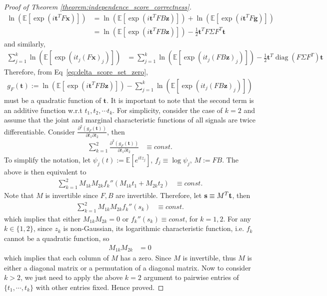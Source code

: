 \documentclass[letterpaper]{article}
\newcommand{\bas}[1]{\begin{align*}#1\end{align*}}
\newcommand{\bx}{\pmb{x}}
\newcommand{\bt}{\pmb{t}}
\newcommand{\bg}{\pmb{g}}
\newcommand{\bz}{\pmb{z}}
\newcommand{\E}{\mathbb{E}}
\newcommand{\bb}[1]{\left(#1\right)}
\newcommand{\bbb}[1]{\left[#1\right]}
\DeclareMathOperator{\diag}{diag}
\begin{document}
\begin{proof}[Proof of Theorem \ref{theorem:independence_score_correctness}]
\bas{
    \ln\bb{\E\bbb{\exp(i\bt^TF\bx)}} &= \ln\bb{\E\bbb{\exp(i\bt^TFB\bz)}} + \ln\bb{\E\bbb{\exp(i\bt^TF\bg)}} \\ 
    &= \ln\bb{\E\bbb{\exp(i\bt^TFB\bz)}} - \frac{1}{2}\bt^T F\Sigma F^T\bt
}
and similarly,
\bas{
    \sum_{j=1}^{k}\ln\bb{\E\bbb{\exp(i t_j (F\bx)_j)}} &= \sum_{j=1}^{k}\ln\bb{\E\bbb{\exp(i t_j (FB\bz)_j)}} - \frac{1}{2}\bt^T\diag\bb{F \Sigma F^T}\bt
}
Therefore, from Eq~\ref{eq:delta_score_set_zero}, 
\bas{
    g_{F}\bb{\bt} := \ln\bb{\E\bbb{\exp(i\bt^TFB\bz)}} - \sum_{j=1}^{k}\ln\bb{\E\bbb{\exp(i t_j (FB\bz)_j)}}
}
must be a quadratic function of $\bt$. 
It is important to note that the second term is an additive function w.r.t $t_1, t_2, \cdots t_k$. For simplicity, consider the case of $k=2$ and assume that the joint and marginal characteristic functions of all signals are twice differentiable. Consider $\frac{\partial^{2}\bb{g_{F}\bb{\bt}}}{\partial t_{1}\partial t_{2}}$, then
\begin{align}
\sum_{k=1}^{2}\frac{\partial^{2}\bb{g_{F}\bb{\bt}}}{\partial t_{1}\partial t_{2}} & \equiv const.\label{eq:2nd-derivative} 
\end{align}
To simplify the notation, let $\psi_{j}(t) := \E\bbb{e^{itz_{j}}}$, $f_{j}\equiv\log\psi_{j}$, $M := FB$. The above is then equivalent to
\begin{align}
\sum_{k=1}^{2}M_{1k}M_{2k}f_{k}''(M_{1k}t_{1}+M_{2k}t_{2}) & \equiv const. \label{eq:f''} 
\end{align}
Note that $M$ is invertible since $F,B$ are invertible. Therefore, let ${\bf s}\equiv M^{T}{\bf t}$, then
\begin{align*}
\sum_{k=1}^{2}M_{1k}M_{2k}f_{k}''(s_{k}) & \equiv const.
\end{align*}
which implies that either $M_{1k}M_{2k}=0$ or $f_{k}''(s_{k})\equiv const$,
for $k=1,2$. For any $k\in\{1,2\}$, since $z_{k}$ is non-Gaussian, its
logarithmic characteristic function, i.e. $f_{k}$ cannot be a quadratic
function, so 
\begin{align*}
M_{1k}M_{2k} &= 0
\end{align*}
which implies that each column of $M$ has a zero. Since $M$ is invertible, thus $M$ is either a diagonal matrix or a permutation of a diagonal matrix. Now to consider $k>2$, we just need to apply the above $k=2$ argument to pairwise entries of $\{t_{1},\cdots,t_{k}\}$ with other entries fixed. Hence proved.
\end{proof}
\end{document}
